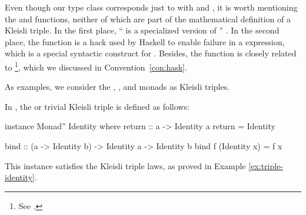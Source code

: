 \begin{remark}
  Even though our  type class corresponds just to
   with  and
  \texthaskell{(>>=)}, it is worth mentioning the \texthaskell{(>>)}
  and  functions, neither of which are part of the
  mathematical definition of a Kleisli triple. In the first place,
  ``\texthaskell{(>>)} is a specialized version of
  \texthaskell{(>>=)}'' \parencite[30]{yorgey-2009}. In the second
  place, the  function is a hack used by Haskell to
  enable failure in a  expression, which is a special
  syntactic construct for 
  \parencites[273]{lipovaca-2011}[88]{peytonjones-2003}[30]{yorgey-2009}.
  Besides, the  function is closely related to
  \footnote{See \parencite[§
      3.1]{peytonjones-2003}.}, which we discussed in
  Convention~\ref{con:hask}.

\end{remark}

As examples, we consider the ,
, and \texthaskell{[]} monads as Kleisli triples.

\begin{example}
  \label{ex:triple-identity-haskell}

  In \hask, the  or trivial Kleisli triple is
  defined as follows:
  \begin{codehaskell}
instance Monad'' Identity where
  return :: a -> Identity a
  return = Identity

  bind :: (a -> Identity b) -> Identity a -> Identity b
  bind f (Identity x) = f x
  \end{codehaskell}
  This instance satisfies the Kleisli triple laws, as proved in
  Example \ref{ex:triple-identity}.

\end{example}


